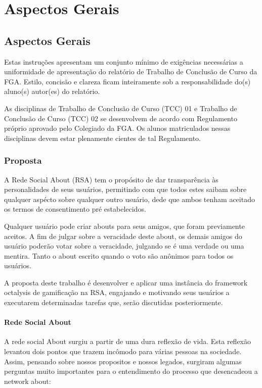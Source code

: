 \part{Aspectos Gerais}

\chapter[Aspectos Gerais]{Aspectos Gerais}

Estas instruções apresentam um conjunto mínimo de exigências necessárias a 
uniformidade de apresentação do relatório de Trabalho de Conclusão de Curso 
da FGA. Estilo, concisão e clareza ficam inteiramente sob a 
responsabilidade do(s) aluno(s) autor(es) do relatório.

As disciplinas de Trabalho de Conclusão de Curso (TCC) 01 e Trabalho de 
Conclusão de Curso (TCC) 02 se desenvolvem de acordo com Regulamento 
próprio aprovado pelo Colegiado da FGA. Os alunos matriculados nessas 
disciplinas devem estar plenamente cientes de tal Regulamento. 

\section{Proposta}
\label{sec:proposta}
A Rede Social About (RSA) tem o propósito de dar transparência às personalidades de seus usuários, permitindo com que todos
estes saibam sobre qualquer aspécto sobre qualquer outro usuário, dede que ambos tenham aceitado os
termos de consentimento pré estabelecidos.

Qualquer usuário pode criar abouts para seus amigos, que foram previamente aceitos. A fim de julgar
sobre a veracidade deste about, os demais amigos do usuário poderão votar sobre a veracidade,
julgando se é uma verdade ou uma mentira. Tanto o about escrito quando o voto são anônimos para todos os
usuários.

A proposta deste trabalho é desenvolver e aplicar uma instância do framework octalysis de gamificação na RSA, engajando e
motivando seus usuários a executarem determinadas tarefas que, serão discutidas posteriormente.


\subsection{Rede Social About}
A rede social About surgiu a partir de uma dura reflexão de vida. Esta reflexão
levantou dois pontos que trazem incômodo para várias pessoas na sociedade.
Assim, pensando sobre
nossos propositos e nossos legados, surgiram algumas perguntas muito importantes
para o entendimento do processo que desencadeou a network about:

